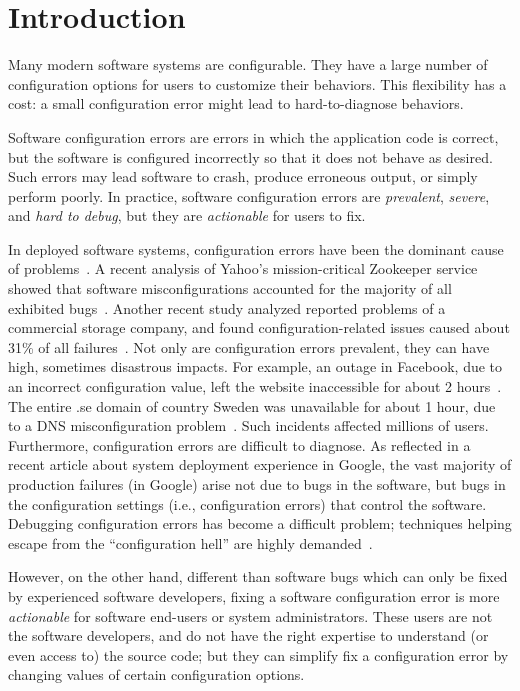 \section{Introduction}
\label{sec:introduction}

Many modern software systems are configurable. They
have a large number of configuration options for users
to customize their behaviors. This flexibility has a cost:
a small configuration error might lead to hard-to-diagnose
behaviors.

Software configuration errors are errors in which
the application code is correct, but the software is
configured incorrectly so that it does not behave
as desired. Such errors may lead software to crash,
produce erroneous output, or simply perform poorly.
In practice, software configuration
errors are \textit{prevalent}, \textit{severe}, and
\textit{hard to debug}, but they are
\textit{actionable} for users
to fix.


In deployed software systems, configuration errors have been
the dominant cause of problems~\cite{}.
A recent analysis of Yahoo's mission-critical Zookeeper service
showed that software misconfigurations accounted for
the majority of all exhibited bugs~\cite{bft}. Another
recent study analyzed reported problems of a commercial
storage company, and found configuration-related issues
caused about 31\% of all failures~\cite{Yin:2011:ESC}.
Not only are configuration errors prevalent, they
can have high, sometimes disastrous impacts. For example,
an outage in Facebook, due to
an incorrect configuration value, left the website 
inaccessible for about 2 hours~\cite{fbout}. 
The entire .se domain of country Sweden was unavailable
for about 1 hour, due to a DNS misconfiguration problem~\cite{sedown}.
Such incidents affected millions of users. Furthermore, configuration
errors are difficult to diagnose.
As reflected in a recent article about system deployment experience
in Google, the vast majority of production failures (in Google)
arise not due to bugs in the software, but bugs in the
configuration settings (i.e., configuration errors)
that control the software. Debugging
configuration errors has become a difficult problem; 
techniques helping escape from the ``configuration hell''
are highly demanded~\cite{googleconf}.

However, on the other hand, different than software bugs
which can only be fixed by experienced software developers, fixing a software
configuration error is more \textit{actionable} for software end-users
or system administrators. These users are not the software developers,
and do not have the right expertise to understand (or even access to)
the source code;  but they can simplify fix a configuration error by changing
values of certain configuration options.


